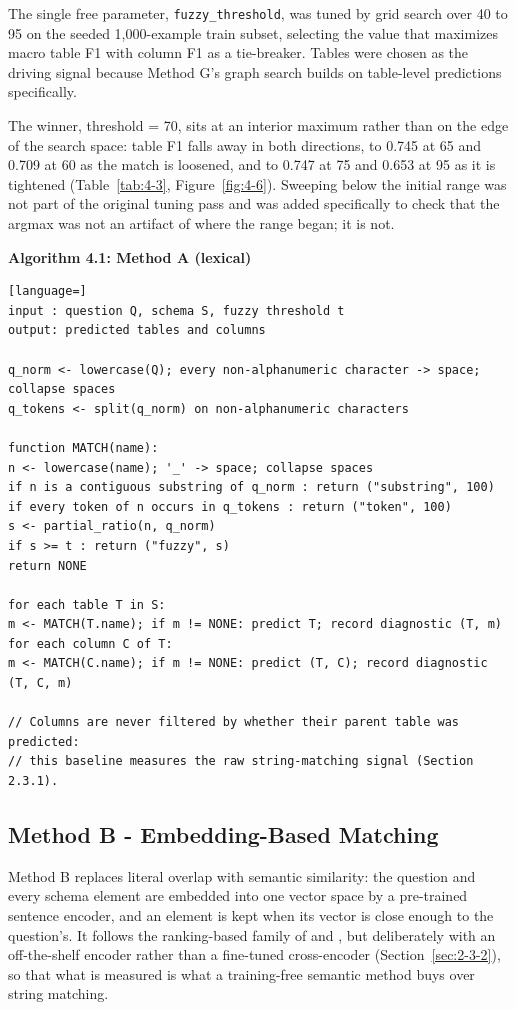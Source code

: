 The single free parameter, \texttt{fuzzy\_threshold}, was tuned by grid search over 40 to 95 on the seeded 1,000-example train subset, selecting the value that maximizes macro table F1 with column F1 as a tie-breaker. Tables were chosen as the driving signal because Method G's graph search builds on table-level predictions specifically.

The winner, threshold = 70, sits at an interior maximum rather than on the edge of the search space: table F1 falls away in both directions, to 0.745 at 65 and 0.709 at 60 as the match is loosened, and to 0.747 at 75 and 0.653 at 95 as it is tightened (Table~\ref{tab:4-3}, Figure~\ref{fig:4-6}). Sweeping below the initial range was not part of the original tuning pass and was added specifically to check that the argmax was not an artifact of where the range began; it is not.

\textbf{Algorithm 4.1: Method A (lexical)}

\begin{lstlisting}[language=]
input : question Q, schema S, fuzzy threshold t
output: predicted tables and columns

q_norm <- lowercase(Q); every non-alphanumeric character -> space; collapse spaces
q_tokens <- split(q_norm) on non-alphanumeric characters

function MATCH(name):
n <- lowercase(name); '_' -> space; collapse spaces
if n is a contiguous substring of q_norm : return ("substring", 100)
if every token of n occurs in q_tokens : return ("token", 100)
s <- partial_ratio(n, q_norm)
if s >= t : return ("fuzzy", s)
return NONE

for each table T in S:
m <- MATCH(T.name); if m != NONE: predict T; record diagnostic (T, m)
for each column C of T:
m <- MATCH(C.name); if m != NONE: predict (T, C); record diagnostic (T, C, m)

// Columns are never filtered by whether their parent table was predicted:
// this baseline measures the raw string-matching signal (Section 2.3.1).
\end{lstlisting}

\subsection{Method B - Embedding-Based Matching}\label{sec:4-2-2}

Method B replaces literal overlap with semantic similarity: the question and every schema element are embedded into one vector space by a pre-trained sentence encoder, and an element is kept when its vector is close enough to the question's. It follows the ranking-based family of \citet{li2023} and \citet{glass2025}, but deliberately with an off-the-shelf encoder rather than a fine-tuned cross-encoder (Section~\ref{sec:2-3-2}), so that what is measured is what a training-free semantic method buys over string matching.

